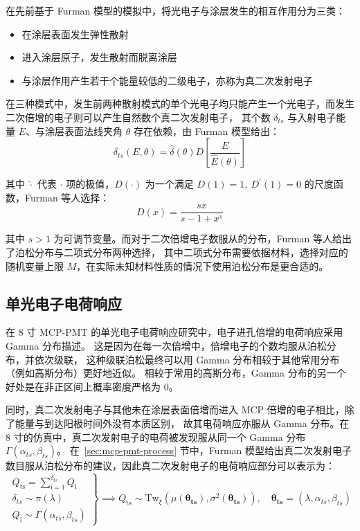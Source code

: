 在先前基于 Furman 模型\cite{PhysRevSTAB.5.124404}的模拟\cite{chenOptimizationElectronCollection2016}中，将光电子与涂层发生的相互作用分为三类：
\begin{itemize}
    \item 在涂层表面发生弹性散射
    \item 进入涂层原子，发生散射而脱离涂层
    \item 与涂层作用产生若干个能量较低的二级电子，亦称为真二次发射电子
\end{itemize}

在三种模式中，发生前两种散射模式的单个光电子均只能产生一个光电子，而发生二次倍增的电子则可以产生自然数个真二次发射电子，
其个数 $\delta_{ts}$ 与入射电子能量 $E$、与涂层表面法线夹角 $\theta$ 存在依赖，由 Furman 模型给出：
\begin{equation}
    \delta_{ts}(E,\theta)=\hat{\delta}(\theta)D\left[\frac{E}{\hat{E}(\theta)}\right]
\end{equation}

其中 $\hat{\cdot}$ 代表 $\cdot$ 项的极值，$D(\cdot)$ 为一个满足 $D(1)=1,\ D^\prime(1)=0$ 的尺度函数，Furman 等人选择：
\begin{equation}
    D(x)=\frac{sx}{s-1+x^s}
\end{equation}

其中 $s>1$ 为可调节变量。而对于二次倍增电子数服从的分布，Furman 等人给出了泊松分布与二项式分布两种选择，
其中二项式分布需要依据材料，选择对应的随机变量上限 $M$，在实际未知材料性质的情况下使用泊松分布是更合适的。

\subsection{单光电子电荷响应}
在 8 寸 MCP-PMT 的单光电子电荷响应研究\cite{wengSingleElectronCharge2024}中，电子进孔倍增的电荷响应采用 Gamma 分布描述。
这是因为在每一次倍增中，倍增电子的个数均服从泊松分布，并依次级联，
这种级联泊松最终可以用 Gamma 分布相较于其他常用分布（例如高斯分布）更好地近似。
相较于常用的高斯分布，Gamma 分布的另一个好处是在非正区间上概率密度严格为 0。

同时，真二次发射电子与其他未在涂层表面倍增而进入 MCP 倍增的电子相比，除了能量与到达阳极时间外没有本质区别，
故其电荷响应亦服从 Gamma 分布。在 8 寸的仿真中，真二次发射电子的电荷被发现服从同一个 Gamma 分布 $\Gamma(\alpha_{ts}, \beta_{ts})$。
在~\ref{sec:mcp-pmt-process} 节中，Furman 模型给出真二次发射电子数目服从泊松分布的建议，因此真二次发射电子的电荷响应部分可以表示为：
\begin{equation}
    \left.
        \begin{array}{c}
        Q_\mathrm{ts}=\sum_{\mathrm{i=1}}^{\delta_{ts}}Q_\mathrm{i}\\
        \delta_{ts}\sim\pi(\lambda)\\
        Q_\mathrm{i}\sim\Gamma(\alpha_{ts},\beta_{ts})
        \end{array}
    \right\}\implies
    Q_\mathrm{ts}\sim\mathrm{Tw}_{\xi}
    \left(\mu(\boldsymbol{\theta_{ts}}),\sigma^2(\boldsymbol{\theta_{ts}})\right),\quad
    \boldsymbol{\theta_{ts}}=(\lambda, \alpha_{ts},\beta_{ts})
    \label{eq:compound-poisson-gamma}
\end{equation}

